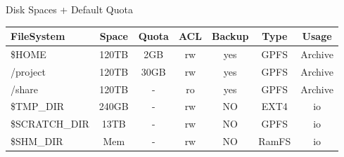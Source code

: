 \documentclass[final,t]{beamer}
\begin{document}
\begin{frame}[fragile]{}
\begin{columns}[t]
\begin{column}{.32\linewidth}
      \begin{block}{Disk Spaces + Default Quota}
        \vspace*{-2ex}
      \begin{center}
      \begin{tabular}{|l|c|c|c|c|c|c|}
      \hline 
      \textbf{FileSystem} & \textbf{Space} & \textbf{Quota} & \textbf{ACL} & \textbf{Backup} & \textbf{Type} & \textbf{Usage}  \\ 
      \hline 
      \$HOME & 120TB & 2GB & rw & yes & GPFS & Archive \\ 
      \hline 
      /project & 120TB & 30GB & rw & yes & GPFS & Archive \\ 
      \hline 
      /share & 120TB & - & ro & yes & GPFS & Archive \\ 
      \hline 
      \$TMP\_DIR & 240GB & - & rw & NO & EXT4 & io \\ 
      \hline 
      \$SCRATCH\_DIR & 13TB & - & rw & NO & GPFS & io \\ 
      \hline 
      \$SHM\_DIR & Mem & - & rw & NO & RamFS & io \\ 
      \hline 
      \end{tabular} 
      \end{center}
        \vspace*{-2ex}
      \end{block}
 
 


 

     \end{column}

    

\end{columns}
\end{frame}
\end{document}
